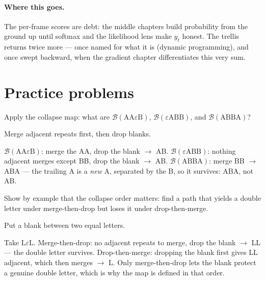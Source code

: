 \begin{narrative}
\paragraph{Where this goes.} The per-frame scores are debt: the middle
chapters build probability from the ground up until softmax and the
likelihood lens make $y_t$ honest. The trellis returns twice more —
once named for what it is (dynamic programming), and once swept
backward, when the gradient chapter differentiates this very sum.
\end{narrative}

\section*{Practice problems}

\begin{problem}
Apply the collapse map: what are
$\mathcal{B}(\mathrm{AA}\varepsilon\mathrm{B})$,
$\mathcal{B}(\varepsilon\mathrm{ABB})$, and
$\mathcal{B}(\mathrm{ABBA})$?
\begin{hint}
Merge adjacent repeats first, then drop blanks.
\end{hint}
\begin{solution}
$\mathcal{B}(\mathrm{AA}\varepsilon\mathrm{B})$: merge the AA, drop the
blank $\to$ AB. $\mathcal{B}(\varepsilon\mathrm{ABB})$: nothing adjacent
merges except BB, drop the blank $\to$ AB.
$\mathcal{B}(\mathrm{ABBA})$: merge BB $\to$ ABA — the trailing A is a
\emph{new} A, separated by the B, so it survives: ABA, not AB.
\end{solution}
\end{problem}

\begin{problem}
Show by example that the collapse order matters: find a path that
yields a double letter under merge-then-drop but loses it under
drop-then-merge.
\begin{hint}
Put a blank between two equal letters.
\end{hint}
\begin{solution}
Take $\mathrm{L}\varepsilon\mathrm{L}$. Merge-then-drop: no adjacent
repeats to merge, drop the blank $\to$ LL — the double letter survives.
Drop-then-merge: dropping the blank first gives LL adjacent, which then
merges $\to$ L. Only merge-then-drop lets the blank protect a genuine
double letter, which is why the map is defined in that order.
\end{solution}
\end{problem}

